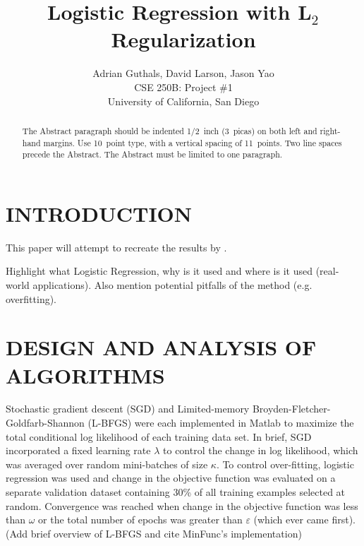 
\title{Logistic Regression with L$_2$ Regularization}

\author{Adrian Guthals, David Larson, Jason Yao \\
CSE 250B: Project \#1 \\
University of California, San Diego \\
}




\maketitle


\begin{abstract}
The Abstract paragraph should be indented 1/2~inch (3~picas) on
both left and right-hand margins. Use 10~point type, with a
vertical spacing of 11~points. Two line spaces precede the Abstract.
The Abstract must be limited to one paragraph.
\end{abstract}





\section{INTRODUCTION}
\label{sec:intro}

This paper will attempt to recreate the results by \cite{t-logistic}.

Highlight what Logistic Regression, why is it used and where is it used (real-world applications). Also mention potential pitfalls of the method (e.g. overfitting).


\section{DESIGN AND ANALYSIS OF ALGORITHMS}
\label{sec:algorithms}
Stochastic gradient descent (SGD) and Limited-memory Broyden-Fletcher-Goldfarb-Shannon (L-BFGS) were each implemented in Matlab to maximize the total conditional log likelihood of each training data set. In brief, SGD incorporated a fixed learning rate $\lambda$ to control the change in log likelihood, which was averaged over random mini-batches of size $\kappa$. To control over-fitting, logistic regression was used and change in the objective function was evaluated on a separate validation dataset containing 30\% of all training examples selected at random. Convergence was reached when change in the objective function was less than $\omega$ or the total number of epochs was greater than $\varepsilon$ (which ever came first). (Add brief overview of L-BFGS and cite MinFunc's implementation)

